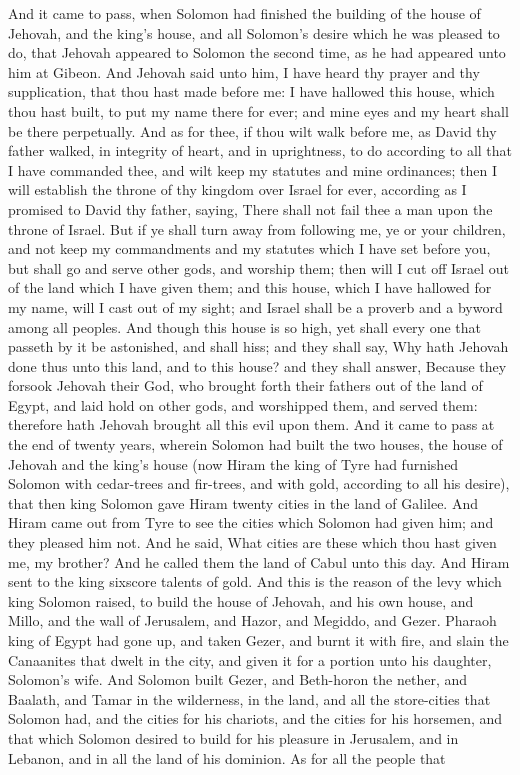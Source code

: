 And it came to pass, when Solomon had finished the building of the house of Jehovah, and the king’s house, and all Solomon’s desire which he was pleased to do, that Jehovah appeared to Solomon the second time, as he had appeared unto him at Gibeon. And Jehovah said unto him, I have heard thy prayer and thy supplication, that thou hast made before me: I have hallowed this house, which thou hast built, to put my name there for ever; and mine eyes and my heart shall be there perpetually. And as for thee, if thou wilt walk before me, as David thy father walked, in integrity of heart, and in uprightness, to do according to all that I have commanded thee, and wilt keep my statutes and mine ordinances; then I will establish the throne of thy kingdom over Israel for ever, according as I promised to David thy father, saying, There shall not fail thee a man upon the throne of Israel. But if ye shall turn away from following me, ye or your children, and not keep my commandments and my statutes which I have set before you, but shall go and serve other gods, and worship them; then will I cut off Israel out of the land which I have given them; and this house, which I have hallowed for my name, will I cast out of my sight; and Israel shall be a proverb and a byword among all peoples. And though this house is so high, yet shall every one that passeth by it be astonished, and shall hiss; and they shall say, Why hath Jehovah done thus unto this land, and to this house? and they shall answer, Because they forsook Jehovah their God, who brought forth their fathers out of the land of Egypt, and laid hold on other gods, and worshipped them, and served them: therefore hath Jehovah brought all this evil upon them.  And it came to pass at the end of twenty years, wherein Solomon had built the two houses, the house of Jehovah and the king’s house (now Hiram the king of Tyre had furnished Solomon with cedar-trees and fir-trees, and with gold, according to all his desire), that then king Solomon gave Hiram twenty cities in the land of Galilee. And Hiram came out from Tyre to see the cities which Solomon had given him; and they pleased him not. And he said, What cities are these which thou hast given me, my brother? And he called them the land of Cabul unto this day. And Hiram sent to the king sixscore talents of gold.  And this is the reason of the levy which king Solomon raised, to build the house of Jehovah, and his own house, and Millo, and the wall of Jerusalem, and Hazor, and Megiddo, and Gezer. Pharaoh king of Egypt had gone up, and taken Gezer, and burnt it with fire, and slain the Canaanites that dwelt in the city, and given it for a portion unto his daughter, Solomon’s wife. And Solomon built Gezer, and Beth-horon the nether, and Baalath, and Tamar in the wilderness, in the land, and all the store-cities that Solomon had, and the cities for his chariots, and the cities for his horsemen, and that which Solomon desired to build for his pleasure in Jerusalem, and in Lebanon, and in all the land of his dominion. As for all the people that 